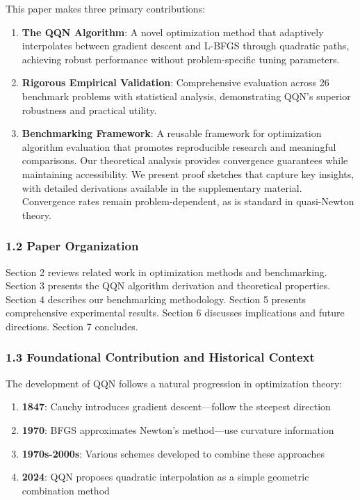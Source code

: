 This paper makes three primary contributions:

\begin{enumerate}
\def\labelenumi{\arabic{enumi}.}
\item
  \textbf{The QQN Algorithm}: A novel optimization method that adaptively interpolates between gradient descent and L-BFGS
  through quadratic paths, achieving robust performance without problem-specific tuning parameters.
\item
  \textbf{Rigorous Empirical Validation}: Comprehensive evaluation across 26 benchmark problems with statistical analysis,
  demonstrating QQN's superior robustness and practical utility.
\item
  \textbf{Benchmarking Framework}: A reusable framework for optimization algorithm evaluation that promotes reproducible
  research and meaningful comparisons.
  Our theoretical analysis provides convergence guarantees while maintaining accessibility. We present proof sketches
  that capture key insights, with detailed derivations available in the supplementary material. Convergence rates
  remain problem-dependent, as is standard in quasi-Newton theory.
\end{enumerate}

\hypertarget{paper-organization}{%
\subsubsection{1.2 Paper Organization}\label{paper-organization}}

Section 2 reviews related work in optimization methods and benchmarking. Section 3 presents the QQN algorithm derivation
and theoretical properties. Section 4 describes our benchmarking methodology. Section 5 presents comprehensive
experimental results. Section 6 discusses implications and future directions. Section 7 concludes.

\hypertarget{foundational-contribution-and-historical-context}{%
\subsubsection{1.3 Foundational Contribution and Historical Context}\label{foundational-contribution-and-historical-context}}

The development of QQN follows a natural progression in optimization theory:

\begin{enumerate}
\def\labelenumi{\arabic{enumi}.}
\tightlist
\item
  \textbf{1847}: Cauchy introduces gradient descent---follow the steepest direction
\item
  \textbf{1970}: BFGS approximates Newton's method---use curvature information
\item
  \textbf{1970s-2000s}: Various schemes developed to combine these approaches
\item
  \textbf{2024}: QQN proposes quadratic interpolation as a simple geometric combination method
\end{enumerate}

